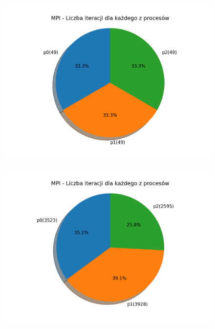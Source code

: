 \documentclass[11pt, a4paper, oneside]{article}
\begin{document}

\begin{figure}[H]
\centering
\begin{minipage}[b]{\dimexpr.5\textwidth-1em}
  \centering
  \includegraphics[width=1\linewidth]{grafiki2/MPI_PSO_T1/MPI_PSO_T1_procIter.png}
  \label{fig:trajektoriaWybrana:PSO1}
\end{minipage} \hfill
\begin{minipage}[b]{\dimexpr.5\textwidth-1em}
  \centering
  \includegraphics[width=1\linewidth]{grafiki2/MPI_MC_T1/MPI_MC_T1_procIter.png}
  \label{fig:trajektoriaWybrana:MC1}
\end{minipage}
\end{figure}
\end{document}
